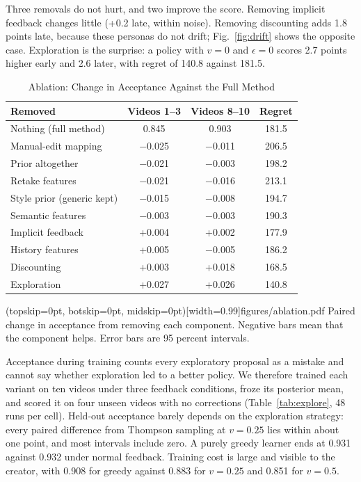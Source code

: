 \documentclass{ieeeaccess}
\begin{document}
Three removals do not hurt, and two improve the score. Removing implicit feedback changes little (+0.2 late, within noise). Removing discounting adds 1.8 points late, because these personas do not drift; Fig.~\ref{fig:drift} shows the opposite case. Exploration is the surprise: a policy with $v=0$ and $\epsilon=0$ scores 2.7 points higher early and 2.6 later, with regret of 140.8 against 181.5.

\begin{table}[t]
\caption{Ablation: Change in Acceptance Against the Full Method}
\label{tab:ablation}
\setlength{\tabcolsep}{3pt}
\centering
\begin{tabular}{|l|c|c|c|}
\hline
Removed & Videos 1--3 & Videos 8--10 & Regret \\
\hline
Nothing (full method) & 0.845 & 0.903 & 181.5 \\
\hline
Manual-edit mapping & $-$0.025 & $-$0.011 & 206.5 \\
Prior altogether & $-$0.021 & $-$0.003 & 198.2 \\
Retake features & $-$0.021 & $-$0.016 & 213.1 \\
Style prior (generic kept) & $-$0.015 & $-$0.008 & 194.7 \\
Semantic features & $-$0.003 & $-$0.003 & 190.3 \\
Implicit feedback & +0.004 & +0.002 & 177.9 \\
History features & +0.005 & $-$0.005 & 186.2 \\
Discounting & +0.003 & +0.018 & 168.5 \\
Exploration & +0.027 & +0.026 & 140.8 \\
\hline
\end{tabular}
\end{table}

\Figure[t!](topskip=0pt, botskip=0pt, midskip=0pt)[width=0.99\columnwidth]{figures/ablation.pdf}
{Paired change in acceptance from removing each component. Negative bars mean that the component helps. Error bars are 95 percent intervals.\label{fig:ablation}}

Acceptance during training counts every exploratory proposal as a mistake and cannot say whether exploration led to a better policy. We therefore trained each variant on ten videos under three feedback conditions, froze its posterior mean, and scored it on four unseen videos with no corrections (Table~\ref{tab:explore}, 48 runs per cell). Held-out acceptance barely depends on the exploration strategy: every paired difference from Thompson sampling at $v=0.25$ lies within about one point, and most intervals include zero. A purely greedy learner ends at 0.931 against 0.932 under normal feedback. Training cost is large and visible to the creator, with 0.908 for greedy against 0.883 for $v=0.25$ and 0.851 for $v=0.5$.
\end{document}
